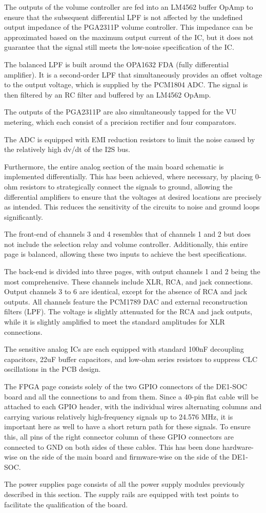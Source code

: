 The outputs of the volume controller are fed into an LM4562 buffer OpAmp to ensure that the subsequent differential LPF is not affected by the undefined output impedance of the PGA2311P volume controller. This impedance can be approximated based on the maximum output current of the IC, but it does not guarantee that the signal still meets the low-noise specification of the IC.

The balanced LPF is built around the OPA1632 FDA (fully differential amplifier). It is a second-order LPF that simultaneously provides an offset voltage to the output voltage, which is supplied by the PCM1804 ADC. The signal is then filtered by an RC filter and buffered by an LM4562 OpAmp.

The outputs of the PGA2311P are also simultaneously tapped for the VU metering, which each consist of a precision rectifier and four comparators.

The ADC is equipped with EMI reduction resistors to limit the noise caused by the relatively high dv/dt of the I2S bus.

Furthermore, the entire analog section of the main board schematic is implemented differentially. This has been achieved, where necessary, by placing 0-ohm resistors to strategically connect the signals to ground, allowing the differential amplifiers to ensure that the voltages at desired locations are precisely as intended. 
This reduces the sensitivity of the circuits to noise and ground loops significantly.

The front-end of channels 3 and 4 resembles that of channels 1 and 2 but does not include the selection relay and volume controller. Additionally, this entire page is balanced, allowing these two inputs to achieve the best specifications.

The back-end is divided into three pages, with output channels 1 and 2 being the most comprehensive. These channels include XLR, RCA, and jack connections. Output channels 3 to 6 are identical, except for the absence of RCA and jack outputs. All channels feature the PCM1789 DAC and external reconstruction filters (LPF). The voltage is slightly attenuated for the RCA and jack outputs, while it is slightly amplified to meet the standard amplitudes for XLR connections.

The sensitive analog ICs are each equipped with standard 100nF decoupling capacitors, 22uF buffer capacitors, and low-ohm series resistors to suppress CLC oscillations in the PCB design.

The FPGA page consists solely of the two GPIO connectors of the DE1-SOC board and all the connections to and from them. Since a 40-pin flat cable will be attached to each GPIO header, with the individual wires alternating columns and carrying various relatively high-frequency signals up to 24.576 MHz, it is important here as well to have a short return path for these signals. To ensure this, all pins of the right connector column of these GPIO connectors are connected to GND on both sides of these cables. This has been done hardware-wise on the side of the main board and firmware-wise on the side of the DE1-SOC.

The power supplies page consists of all the power supply modules previously described in this section. The supply rails are equipped with test points to facilitate the qualification of the board.